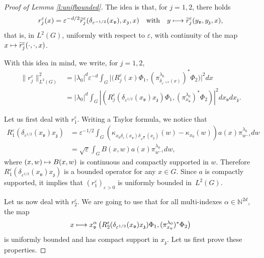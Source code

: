 \documentclass[10pt]{amsart}
\newcommand\mto{\mathchoice{\longmapsto}{\mapsto}{\mapsto}{\mapsto}}
\theoremstyle{plain}
\theoremstyle{definition}
\let\eps\varepsilon
\def\N{{\mathbb N}}
\begin{document}
\begin{proof}[Proof of Lemma \ref{l:unifbounded}]
The idea is that, for $j=1,2$, there holds
\[
r_j^\eps(x)= \eps^{-d/2} \widetilde r_j^\eps(\delta_{\eps^{-1/2}} (x_{\mathfrak v}), x_{\mathfrak z}, x)\quad\text{with}\quad
y\mto \widetilde r_j^\eps (y_{\mathfrak v}, y_{\mathfrak z}, x),
\]
that is, in $L^2(G)$, uniformly with respect to $\eps$, with continuity of the map $x\mto \widetilde r_j^\eps (\cdot,\cdot, x)$.

With this idea in mind, we write, for $j=1,2$,
\begin{align*}
\| r_j^\eps\|_{L^2(G)}^2 &
= |\lambda_0|^{d}\eps ^{-d} \int_G \bigl| \bigl(R_j^\eps(x) \Phi_1,
(\pi^{\lambda_0}_{\delta_{\eps^{-1/2} }(x)})^*\Phi_2 \bigr) \bigr|^2 dx\\
\label{eq:boundtoto}
&= |\lambda_0|^{d} \int_G\left|\left(R_j^\eps(\delta_{\eps^{1/2}} (x_{\mathfrak v})x_{\mathfrak z}) \Phi_1,
(\pi^{\lambda_0}_{x_{\mathfrak v}})^*\Phi_2\right)\right|^2 dx_{\mathfrak v} dx_{\mathfrak z}.
\end{align*}

Let us first deal with $r_1^\eps$. Writing a Taylor formula, we notice that
\begin{align*}
R_1^\eps(\delta_{\eps^{1/2}} (x_{\mathfrak v})x_{\mathfrak z})&=\eps^{-1/2} \int_{G} (\kappa_{x_0\delta_{\eps}(x_{\mathfrak v}) \delta_{\sqrt\eps}(x_{\mathfrak z})}(w)-\kappa_{x_0}(w))a(x) \pi_{ w^{-1} }^{\lambda_0} dw \\
&=\sqrt\eps \int_G B(x,w)a(x)\pi_{ w^{-1} }^{\lambda_0} dw,
\end{align*}
where $(x,w)\mto B(x,w)$ is continuous and compactly supported in $w$. Therefore $R_1^\eps(\delta_{\eps^{1/2}} (x_{\mathfrak v})x_{\mathfrak z})$ is a bounded operator for any $x\in G$. Since $a$ is compactly supported, it implies that $(r_1^\eps)_{\eps>0}$ is uniformly bounded in~$L^2(G)$.

Let us now deal with $r_2^\eps$. We are going to use that for all multi-indexes $\alpha\in\N^{2d}$, the map
\begin{equation} \label{e:map}
x\mto x_{\mathfrak v}^\alpha \left(R_2^\eps(\delta_{\eps^{1/2}} (x_{\mathfrak v})x_{\mathfrak z}) \Phi_1,
(\pi^{\lambda_0}_{x_{\mathfrak v}})^*\Phi_2\right)
\end{equation}
is uniformly bounded and has compact support in $x_{\mathfrak z}$. Let us first prove these properties.


\end{proof}
\end{document}
